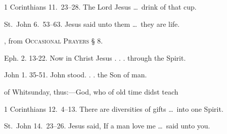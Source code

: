  1 Corinthians 11.~23–28.   The Lord Jesus \ldots\ drink of that cup.

 St.~John 6.~53–63.   Jesus said unto them \ldots\ they are life.


{\centering{}\par}
 

\medskip



{\centering{}\par}\par


, from {\scshape Occasional Prayers} § 8.

 Eph. 2. 13-22.   Now in Christ Jesus . . . through the Spirit.

 John 1. 35-51.   John stood. . . the Son of man.

\medskip


 of Whitsunday, thus:—God, who of old time didst teach \etc

 1 Corinthians 12.~4–13.   There are diversities of gifts \ldots\ into one Spirit.

 St.~John 14.~23–26.   Jesus said, If a man love me \ldots\ said unto you.